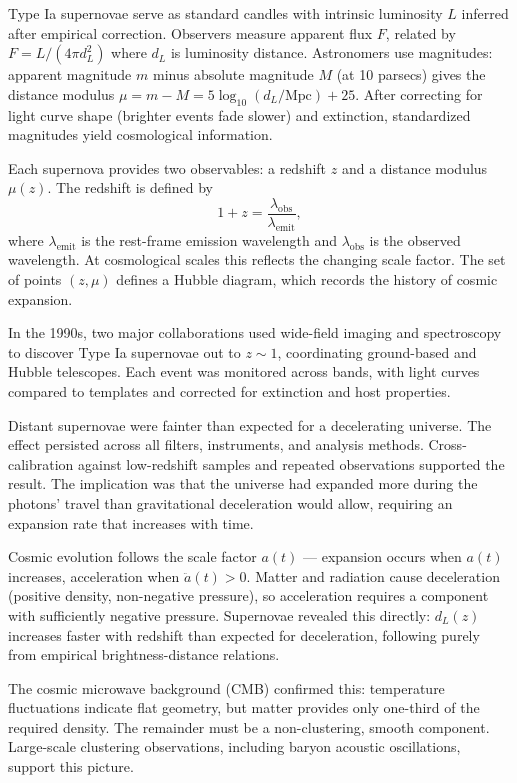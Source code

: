 Type Ia supernovae serve as standard candles with intrinsic luminosity $L$ inferred after empirical correction. Observers measure apparent flux $F$, related by $F = L/(4\pi d_L^2)$ where $d_L$ is luminosity distance. Astronomers use magnitudes: apparent magnitude $m$ minus absolute magnitude $M$ (at 10 parsecs) gives the distance modulus $\mu = m - M = 5 \log_{10}(d_L/\text{Mpc}) + 25$. After correcting for light curve shape (brighter events fade slower) and extinction, standardized magnitudes yield cosmological information.

Each supernova provides two observables: a redshift $z$ and a distance modulus $\mu(z)$. The redshift is defined by
\[
1 + z = \frac{\lambda_{\text{obs}}}{\lambda_{\text{emit}}},
\]
where $\lambda_{\text{emit}}$ is the rest-frame emission wavelength and $\lambda_{\text{obs}}$ is the observed wavelength. At cosmological scales this reflects the changing scale factor. The set of points $(z, \mu)$ defines a Hubble diagram, which records the history of cosmic expansion.

In the 1990s, two major collaborations used wide-field imaging and spectroscopy to discover Type Ia supernovae out to $z \sim 1$, coordinating ground-based and Hubble telescopes. Each event was monitored across bands, with light curves compared to templates and corrected for extinction and host properties.

Distant supernovae were fainter than expected for a decelerating universe. The effect persisted across all filters, instruments, and analysis methods. Cross-calibration against low-redshift samples and repeated observations supported the result. The implication was that the universe had expanded more during the photons’ travel than gravitational deceleration would allow, requiring an expansion rate that increases with time.

Cosmic evolution follows the scale factor $a(t)$ — expansion occurs when $a(t)$ increases, acceleration when $\ddot{a}(t) > 0$. Matter and radiation cause deceleration (positive density, non-negative pressure), so acceleration requires a component with sufficiently negative pressure. Supernovae revealed this directly: $d_L(z)$ increases faster with redshift than expected for deceleration, following purely from empirical brightness-distance relations.

The cosmic microwave background (CMB) confirmed this: temperature fluctuations indicate flat geometry, but matter provides only one-third of the required density. The remainder must be a non-clustering, smooth component. Large-scale clustering observations, including baryon acoustic oscillations, support this picture.

